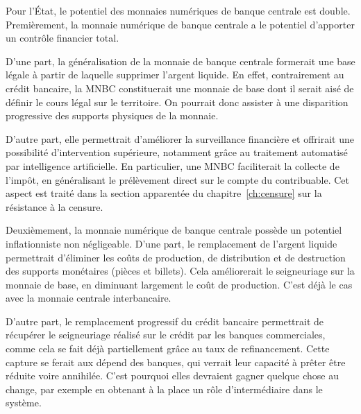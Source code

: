
Pour l'État, le potentiel des monnaies numériques de banque centrale est double. Premièrement, la monnaie numérique de banque centrale a le potentiel d'apporter un contrôle financier total.

D'une part, la généralisation de la monnaie de banque centrale formerait une base légale à partir de laquelle supprimer l'argent liquide. En effet, contrairement au crédit bancaire, la MNBC constituerait une monnaie de base dont il serait aisé de définir le cours légal sur le territoire. On pourrait donc assister à une disparition progressive des supports physiques de la monnaie.

D'autre part, elle permettrait d'améliorer la surveillance financière et offrirait une possibilité d'intervention supérieure, notamment grâce au traitement automatisé par intelligence artificielle. En particulier, une MNBC faciliterait la collecte de l'impôt, en généralisant le prélèvement direct sur le compte du contribuable. Cet aspect est traité dans la section apparentée du chapitre~\ref{ch:censure} sur la résistance à la censure.


Deuxièmement, la monnaie numérique de banque centrale possède un potentiel inflationniste non négligeable. D'une part, le remplacement de l'argent liquide permettrait d'éliminer les coûts de production, de distribution et de destruction des supports monétaires (pièces et billets). Cela améliorerait le seigneuriage sur la monnaie de base, en diminuant largement le coût de production. C'est déjà le cas avec la monnaie centrale interbancaire.

D'autre part, le remplacement progressif du crédit bancaire permettrait de récupérer le seigneuriage réalisé sur le crédit par les banques commerciales, comme cela se fait déjà partiellement grâce au taux de refinancement. Cette capture se ferait aux dépend des banques, qui verrait leur capacité à prêter être réduite voire annihilée. C'est pourquoi elles devraient gagner quelque chose au change, par exemple en obtenant à la place un rôle d'intermédiaire dans le système.

